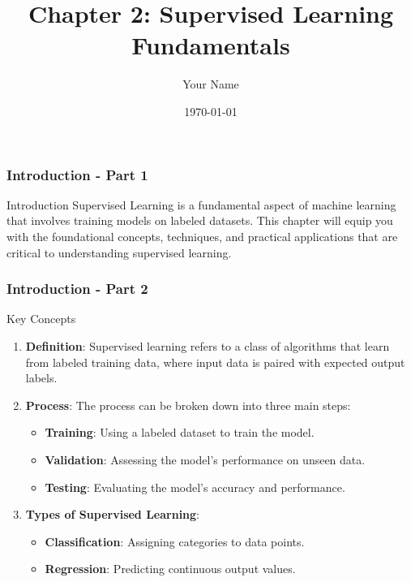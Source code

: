 \documentclass{beamer}
\title{Chapter 2: Supervised Learning Fundamentals}
\author{Your Name}
\institute{Your Institution}
\date{\today}
\begin{document}
\frame{\titlepage}

\begin{frame}[fragile]
    \frametitle{Introduction - Part 1}
    \begin{block}{Introduction}
        Supervised Learning is a fundamental aspect of machine learning that involves training models on labeled datasets. This chapter will equip you with the foundational concepts, techniques, and practical applications that are critical to understanding supervised learning.
    \end{block}
\end{frame}

\begin{frame}[fragile]
    \frametitle{Introduction - Part 2}
    \begin{block}{Key Concepts}
        \begin{enumerate}
            \item \textbf{Definition}: 
                Supervised learning refers to a class of algorithms that learn from labeled training data, where input data is paired with expected output labels.
            \item \textbf{Process}: 
                The process can be broken down into three main steps:
                \begin{itemize}
                    \item \textbf{Training}: Using a labeled dataset to train the model.
                    \item \textbf{Validation}: Assessing the model's performance on unseen data.
                    \item \textbf{Testing}: Evaluating the model's accuracy and performance.
                \end{itemize}
                
            \item \textbf{Types of Supervised Learning}:
                \begin{itemize}
                    \item \textbf{Classification}: Assigning categories to data points.
                    \item \textbf{Regression}: Predicting continuous output values.
                \end{itemize}
        \end{enumerate}
    \end{block}
\end{frame}
\end{document}

